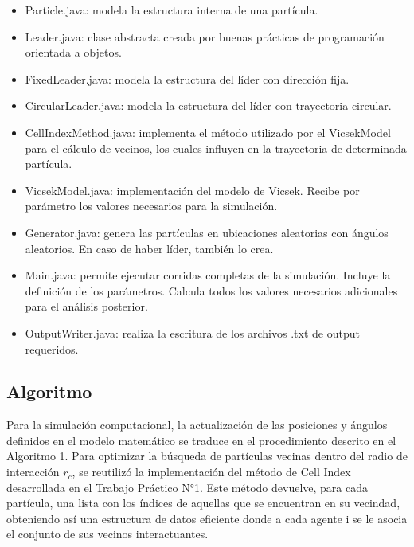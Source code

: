 \documentclass[a4paper,12pt]{article}
\begin{document}
\begin{itemize}
	\item Particle.java: modela la estructura interna de una partícula.
	\item Leader.java: clase abstracta creada por buenas prácticas de programación orientada a objetos.
	\item FixedLeader.java: modela la estructura del líder con dirección fija.
	\item CircularLeader.java: modela la estructura del líder con trayectoria circular.
	\item CellIndexMethod.java: implementa el método utilizado por el VicsekModel para el cálculo de vecinos, los cuales influyen en la trayectoria de determinada partícula.
	\item VicsekModel.java: implementación del modelo de Vicsek. Recibe por parámetro los valores necesarios para la simulación.
	\item Generator.java: genera las partículas en ubicaciones aleatorias con ángulos aleatorios. En caso de haber líder, también lo crea.
	\item Main.java: permite ejecutar corridas completas de la simulación. Incluye la definición de los parámetros. Calcula todos los valores necesarios adicionales para el análisis posterior.
	\item OutputWriter.java: realiza la escritura de los archivos .txt de output requeridos.
\end{itemize}

\subsection{Algoritmo}

Para la simulación computacional, la actualización de las posiciones y ángulos definidos en el modelo matemático se traduce en el procedimiento descrito en el Algoritmo 1.
Para optimizar la búsqueda de partículas vecinas dentro del radio de interacción $r_c$, se reutilizó la implementación del método de Cell Index desarrollada en el Trabajo Práctico N°1. Este método devuelve, para cada partícula, una lista con los índices de aquellas que se encuentran en su vecindad, obteniendo así una estructura de datos eficiente donde a cada agente i se le asocia el conjunto de sus vecinos interactuantes.
\end{document}
